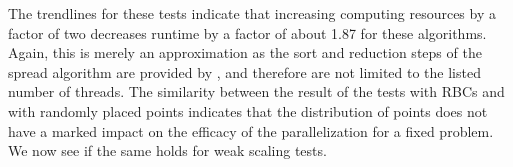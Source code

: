 The trendlines for these tests indicate that increasing computing resources
by a factor of two decreases runtime by a factor of about 1.87 for these
algorithms. Again, this is merely an approximation as the sort and reduction
steps of the spread algorithm are provided by {\thrust}, and therefore are
not limited to the listed number of threads. The similarity between the result
of the tests with RBCs and with randomly placed points indicates that the
distribution of points does not have a marked impact on the efficacy of the
parallelization for a fixed problem. We now see if the same holds for weak
scaling tests.


